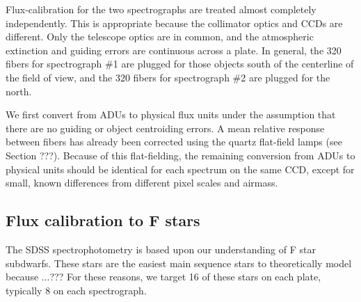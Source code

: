 \documentclass[12pt,preprint]{aastex}
\newcommand{\ergs}{{\rm ~erg~s}^{-1}}
\newcommand{\ergscmang}{{\rm ~erg~s}^{-1}{\rm cm}^{-2}{\rm\AA}^{-1}}
\begin{document}
Flux-calibration for the two spectrographs are treated almost completely
independently.  This is appropriate because the collimator optics
and CCDs are different.  Only the telescope optics are in common, and the
atmospheric extinction and guiding errors are continuous across a plate.
In general, the 320 fibers for spectrograph \#1 are plugged for those
objects south of the centerline of the field of view, and the 320 fibers
for spectrograph \#2 are plugged for the north.


We first convert from ADUs to physical flux units under the
assumption that there are no guiding or object centroiding errors.
A mean relative response between fibers has already been corrected
using the quartz flat-field lamps (see Section ???).
Because of this flat-fielding, the remaining conversion from ADUs
to physical units should be identical for each spectrum on the 
same CCD, except for small, known differences from different pixel scales
and airmass.

\subsection{Flux calibration to F stars}

The SDSS spectrophotometry is based upon our understanding
of F star subdwarfs.  These stars are the easiest main sequence
stars to theoretically model because ...???
For these reasons, we target 16 of these stars on each plate,
typically 8 on each spectrograph.


\end{document}
